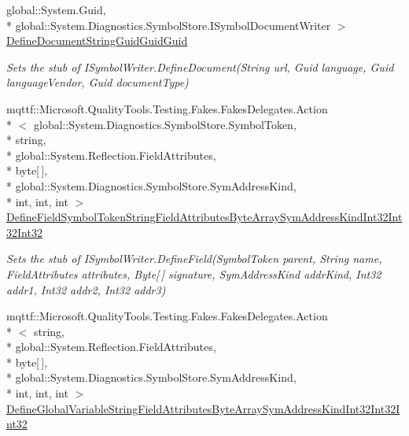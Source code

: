 \begin{DoxyCompactItemize}
global\-::\-System.\-Guid, \\*
global\-::\-System.\-Diagnostics.\-Symbol\-Store.\-I\-Symbol\-Document\-Writer $>$ \hyperlink{class_system_1_1_diagnostics_1_1_symbol_store_1_1_fakes_1_1_stub_i_symbol_writer_ab57ed8246d4f1ebb7cafded8f0cc5d53}{Define\-Document\-String\-Guid\-Guid\-Guid}
\begin{DoxyCompactList}\small\item\em Sets the stub of I\-Symbol\-Writer.\-Define\-Document(\-String url, Guid language, Guid language\-Vendor, Guid document\-Type)\end{DoxyCompactList}\item 
mqttf\-::\-Microsoft.\-Quality\-Tools.\-Testing.\-Fakes.\-Fakes\-Delegates.\-Action\\*
$<$ global\-::\-System.\-Diagnostics.\-Symbol\-Store.\-Symbol\-Token, \\*
string, \\*
global\-::\-System.\-Reflection.\-Field\-Attributes, \\*
byte\mbox{[}$\,$\mbox{]}, \\*
global\-::\-System.\-Diagnostics.\-Symbol\-Store.\-Sym\-Address\-Kind, \\*
int, int, int $>$ \hyperlink{class_system_1_1_diagnostics_1_1_symbol_store_1_1_fakes_1_1_stub_i_symbol_writer_a93c9ec5d765e7e3f45606fb4eb352bc8}{Define\-Field\-Symbol\-Token\-String\-Field\-Attributes\-Byte\-Array\-Sym\-Address\-Kind\-Int32\-Int32\-Int32}
\begin{DoxyCompactList}\small\item\em Sets the stub of I\-Symbol\-Writer.\-Define\-Field(\-Symbol\-Token parent, String name, Field\-Attributes attributes, Byte\mbox{[}$\,$\mbox{]} signature, Sym\-Address\-Kind addr\-Kind, Int32 addr1, Int32 addr2, Int32 addr3)\end{DoxyCompactList}\item 
mqttf\-::\-Microsoft.\-Quality\-Tools.\-Testing.\-Fakes.\-Fakes\-Delegates.\-Action\\*
$<$ string, \\*
global\-::\-System.\-Reflection.\-Field\-Attributes, \\*
byte\mbox{[}$\,$\mbox{]}, \\*
global\-::\-System.\-Diagnostics.\-Symbol\-Store.\-Sym\-Address\-Kind, \\*
int, int, int $>$ \hyperlink{class_system_1_1_diagnostics_1_1_symbol_store_1_1_fakes_1_1_stub_i_symbol_writer_a55b59e97ce13dcdde1ecd8e3ab251d62}{Define\-Global\-Variable\-String\-Field\-Attributes\-Byte\-Array\-Sym\-Address\-Kind\-Int32\-Int32\-Int32}

\end{DoxyCompactItemize}
